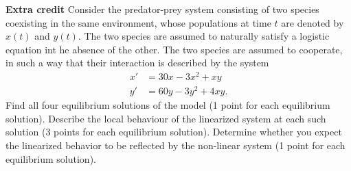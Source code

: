 \documentclass[11pt]{exam}
\begin{document}
\begin{questions}

\newpage
\addpoints 
\question[20] \textbf{Extra credit} Consider the predator-prey system consisting of two species coexisting in the same environment, whose populations at time $t$ are denoted by $x(t)$ and $y(t)$. The two species are assumed to naturally satisfy a logistic equation int he absence of the other. The two species are assumed to cooperate, in such a way that their interaction is described by the system
\begin{align*}
x' & =30x-3x^2+xy \\
y' & = 60y-3y^2+4xy.
\end{align*}
Find all four equilibrium solutions of the model (1 point for each equilibrium solution). Describe the local behaviour of the linearized system at each such solution (3 points for each equilibrium solution). Determine whether you expect the linearized behavior to be reflected by the non-linear system (1 point for each equilibrium solution).
\vfill 
\end{questions}
\end{document}

